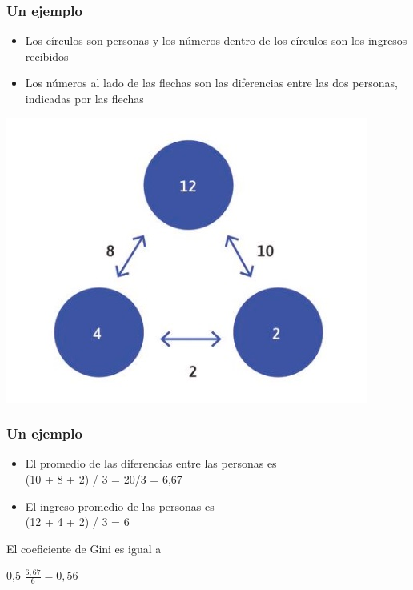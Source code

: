 \documentclass{beamer}
\begin{document}
\begin{frame} 
\frametitle{Un ejemplo}
\begin{itemize}
    \item Los círculos son personas y los números dentro de los círculos son los ingresos recibidos
    \item Los números al lado de las flechas son las diferencias entre las dos personas, indicadas por las flechas
\end{itemize} 
    \begin{center}    
    \includegraphics[scale=0.5]{../Tema_04.15_gini.jpg}
    \end{center}
\end{frame}

\begin{frame} 
\frametitle{Un ejemplo}
\begin{itemize}
    \item El promedio de las diferencias entre las personas es \\ (10 + 8 + 2) / 3 = 20/3 = 6,67 \\ \vspace{3mm}
    \item El ingreso promedio de las personas es \\ (12 + 4 + 2) / 3 = 6
\end{itemize}
\vspace{3mm}

El coeficiente de Gini es igual a 
\begin{center}
    0,5 $ \frac{6,67}{6} = 0,56$
\end{center}
\end{frame}
\end{document}
